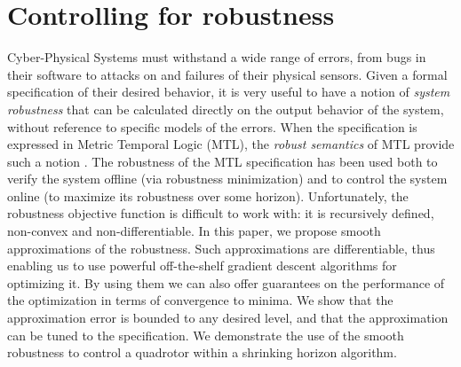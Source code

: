 \section{Controlling for robustness}
\label{sec:intro}
Cyber-Physical Systems must withstand a wide range of errors, from bugs in their software to attacks on and failures of their physical sensors.
Given a formal specification of their desired behavior, it is very useful to have a notion of \textit{system robustness} that can be calculated directly on the output behavior of the system, without reference to specific models of the errors.
When the specification is expressed in Metric Temporal Logic (MTL), the \textit{robust semantics} of MTL provide such a notion \cite{FainekosGP06formats}.
The robustness of the MTL specification has been used both to verify the system offline (via robustness minimization) and to control the system online (to maximize its robustness over some horizon).
Unfortunately, the robustness objective function is difficult to work with: it is recursively defined, non-convex and non-differentiable.
In this paper, we propose smooth approximations of the robustness. 
Such approximations are differentiable, thus enabling us to use powerful off-the-shelf gradient descent algorithms for optimizing it.
By using them we can also offer guarantees on the performance of the optimization in terms of convergence to minima.
We show that the approximation error is bounded to any desired level, and that the approximation can be tuned to the specification.
We demonstrate the use of the smooth robustness to control a quadrotor within a shrinking horizon algorithm. 


